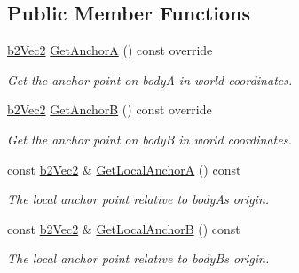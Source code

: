 \subsection*{Public Member Functions}
\begin{DoxyCompactItemize}
\item 
\mbox{\label{classb2_revolute_joint_a9878591c460a4e1575f8a77c237608ae}} 
\hyperlink{structb2_vec2}{b2\+Vec2} \hyperlink{classb2_revolute_joint_a9878591c460a4e1575f8a77c237608ae}{Get\+AnchorA} () const override
\begin{DoxyCompactList}\small\item\em Get the anchor point on bodyA in world coordinates. \end{DoxyCompactList}\item 
\mbox{\label{classb2_revolute_joint_aa30a5d414b2ff699cc17567ff6e53e6b}} 
\hyperlink{structb2_vec2}{b2\+Vec2} \hyperlink{classb2_revolute_joint_aa30a5d414b2ff699cc17567ff6e53e6b}{Get\+AnchorB} () const override
\begin{DoxyCompactList}\small\item\em Get the anchor point on bodyB in world coordinates. \end{DoxyCompactList}\item 
\mbox{\label{classb2_revolute_joint_af8cefd09d50a4e349613722809b8c823}} 
const \hyperlink{structb2_vec2}{b2\+Vec2} \& \hyperlink{classb2_revolute_joint_af8cefd09d50a4e349613722809b8c823}{Get\+Local\+AnchorA} () const
\begin{DoxyCompactList}\small\item\em The local anchor point relative to bodyA\textquotesingle{}s origin. \end{DoxyCompactList}\item 
\mbox{\label{classb2_revolute_joint_ac58e115df370181adc1ea1c486d84dc6}} 
const \hyperlink{structb2_vec2}{b2\+Vec2} \& \hyperlink{classb2_revolute_joint_ac58e115df370181adc1ea1c486d84dc6}{Get\+Local\+AnchorB} () const
\begin{DoxyCompactList}\small\item\em The local anchor point relative to bodyB\textquotesingle{}s origin. \end{DoxyCompactList}\item 
\mbox{\label{classb2_revolute_joint_ae84b9659fe94f41f54f43d3f64ee0741}} 

\end{DoxyCompactItemize}
